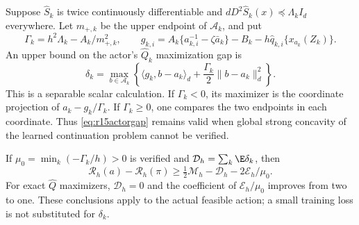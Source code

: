 \begin{proposition}
\label{prop:r15actorgap}
Suppose $\widehat S_k$ is twice continuously differentiable and
$dD^2\widehat S_k(x)\preceq\Lambda_k I_d$ everywhere. Let
$m_{+,k}$ be the upper endpoint of $\mathcal A_k$, and put
\[
 \Gamma_k=h^2\Lambda_k-A_k/m_{+,k}^2,\qquad
 g_{k,i}=A_k\{a_{k,i}^{-1}-\zeta\bar a_k\}
                    -B_k-h\widehat q_{k,i}\{x_{a_k}(Z_k)\}.
\]
An upper bound on the actor's $\widehat Q_k$ maximization gap is
\begin{equation}
 \delta_k=\max_{b\in\mathcal A_k}
     \left\{\langle g_k,b-a_k\rangle_d
                      +\frac{\Gamma_k}{2}\|b-a_k\|_d^2\right\}.
 \label{eq:r15actorgap}
\end{equation}
This is a separable scalar calculation. If $\Gamma_k<0$, its maximizer
is the coordinate projection of $a_k-g_k/\Gamma_k$. If
$\Gamma_k\geq0$, one compares the two endpoints in each coordinate.
Thus \eqref{eq:r15actorgap} remains valid when global strong concavity
of the learned continuation problem cannot be verified.

If $\mu_0=\min_k(-\Gamma_k/h)>0$ is verified and
$\mathcal D_h=\sum_k\E\delta_k$, then
\begin{equation}
 \mathcal R_h(a)-\mathcal R_h(\pi)
       \geq\tfrac12\mathcal M_h-\mathcal D_h
                            -2\mathcal E_h/\mu_0.
 \label{eq:r15quadratic}
\end{equation}
For exact $\widehat Q$ maximizers, $\mathcal D_h=0$ and the coefficient
of $\mathcal E_h/\mu_0$ improves from two to one. These conclusions
apply to the actual feasible action; a small training loss is not
substituted for $\delta_k$.
\end{proposition}

